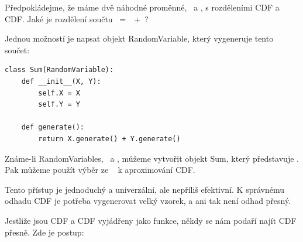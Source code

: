 \documentclass[12pt]{book}
\begin{document}
Předpokládejme, že máme dvě náhodné proměnné, \X~a \Y,
s rozděleními CDF a CDF. Jaké je rozdělení součtu \Z~=~\X~+~\Y?

Jednou možností je napsat objekt RandomVariable, který vygeneruje tento součet:
%
\begin{verbatim}
class Sum(RandomVariable):
    def __init__(X, Y):
        self.X = X
        self.Y = Y

    def generate():
        return X.generate() + Y.generate()
\end{verbatim}

Známe-li RandomVariables, \X~a \Y, můžeme vytvořit objekt Sum, který představuje \Z.  Pak můžeme použít výběr ze \Z~ k aproximování CDF.

Tento přístup je jednoduchý a univerzální, ale nepříliš efektivní.  K správnému odhadu CDF je potřeba vygenerovat velký vzorek, a ani tak není odhad přesný.

Jestliže jsou CDF a CDF vyjádřeny jako funkce, někdy se nám podaří najít CDF přesně.  Zde je postup:

\newcommand{\infint}{\int_{-\infty}^{\infty}}
\newcommand{\spa}{~}
\newcommand{\given}{~|~}
\end{document}
